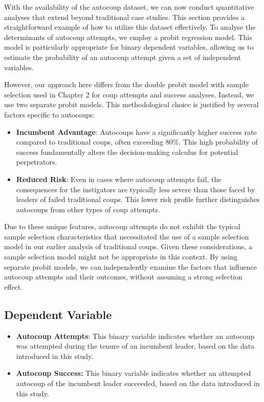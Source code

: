 \documentclass[
  12pt,
]{report}
\begin{document}
With the availability of the autocoup dataset, we can now conduct
quantitative analyses that extend beyond traditional case studies. This
section provides a straightforward example of how to utilize this
dataset effectively. To analyse the determinants of autocoup attempts,
we employ a probit regression model. This model is particularly
appropriate for binary dependent variables, allowing us to estimate the
probability of an autocoup attempt given a set of independent variables.

However, our approach here differs from the double probit model with
sample selection used in Chapter 2 for coup attempts and success
analyses. Instead, we use two separate probit models. This
methodological choice is justified by several factors specific to
autocoups:

\begin{itemize}
\item
  \textbf{Incumbent Advantage}: Autocoups have a significantly higher
  success rate compared to traditional coups, often exceeding 80\%. This
  high probability of success fundamentally alters the decision-making
  calculus for potential perpetrators.
\item
  \textbf{Reduced Risk}: Even in cases where autocoup attempts fail, the
  consequences for the instigators are typically less severe than those
  faced by leaders of failed traditional coups. This lower risk profile
  further distinguishes autocoups from other types of coup attempts.
\end{itemize}

Due to these unique features, autocoup attempts do not exhibit the
typical sample selection characteristics that necessitated the use of a
sample selection model in our earlier analysis of traditional coups.
Given these considerations, a sample selection model might not be
appropriate in this context. By using separate probit models, we can
independently examine the factors that influence autocoup attempts and
their outcomes, without assuming a strong selection effect.

\subsection{Dependent Variable}\label{dependent-variable-1}

\begin{itemize}
\item
  \textbf{Autocoup Attempts}: This binary variable indicates whether an
  autocoup was attempted during the tenure of an incumbent leader, based
  on the data introduced in this study.
\item
  \textbf{Autocoup Success:} This binary variable indicates whether an
  attempted autocoup of the incumbent leader succeeded, based on the
  data introduced in this study.
\end{itemize}
\end{document}
